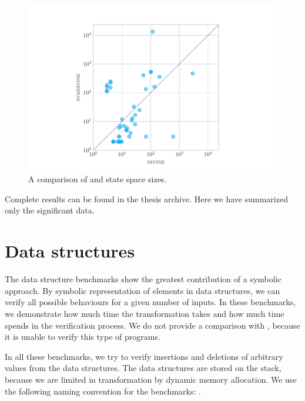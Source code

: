 \begin{figure}
\includegraphics[width=\textwidth]{img/scatter.pdf}
    \caption{A comparison of \DIVINE and \SymDIVINE state space sizes.}
    \label{fig:ss}
\end{figure}

Complete results can be found in the thesis archive. Here we have summarized
only the significant data.

\section{Data structures}

The data structure benchmarks show the greatest contribution of a symbolic
approach. By symbolic representation of elements in data structures, we can
verify all possible behaviours for a given number of inputs. In these
benchmarks, we demonstrate how much time the transformation takes and how
much time \DIVINE spends in the verification process. We do not provide a
comparison with \SymDIVINE, because it is unable to verify this type of
programs.

In all these benchmarks, we try to verify insertions and deletions of arbitrary
values from the data structures. The data structures are stored on the
stack, because we are limited in transformation by dynamic memory allocation.
We use the following naming convention for the benchmarks: .

